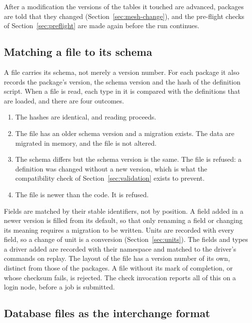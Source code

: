 \documentclass[11pt,a4paper]{article}
\begin{document}
After a modification the versions of the tables it touched are advanced,
packages are told that they changed (Section~\ref{sec:mesh-change}), and
the pre-flight checks of Section~\ref{sec:preflight} are made again before
the run continues.

\subsection{Matching a file to its schema}
\label{sec:file-schema}

A file carries its schema, not merely a version number.  For each package
it also records the package's version, the schema version and the hash of
the definition script.  When a file is read, each type in it is compared
with the definitions that are loaded, and there are four outcomes.

\begin{enumerate}
  \item The hashes are identical, and reading proceeds.
  \item The file has an older schema version and a migration exists.  The
        data are migrated in memory, and the file is not altered.
  \item The schema differs but the schema version is the same.  The file is
        refused: a definition was changed without a new version, which is
        what the compatibility check of Section~\ref{sec:validation} exists
        to prevent.
  \item The file is newer than the code.  It is refused.
\end{enumerate}

Fields are matched by their stable identifiers, not by position.  A field
added in a newer version is filled from its default, so that only renaming
a field or changing its meaning requires a migration to be written.  Units
are recorded with every field, so a change of unit is a conversion
(Section~\ref{sec:units}).  The fields and types a driver added are
recorded with their namespace and matched to the driver's commands on
replay.  The layout of the file has a version number of its own, distinct
from those of the packages.  A file without its mark of completion, or
whose checksum fails, is rejected.  The check invocation reports all of
this on a login node, before a job is submitted.

\subsection{Database files as the interchange format}
\label{sec:interchange}
\end{document}
